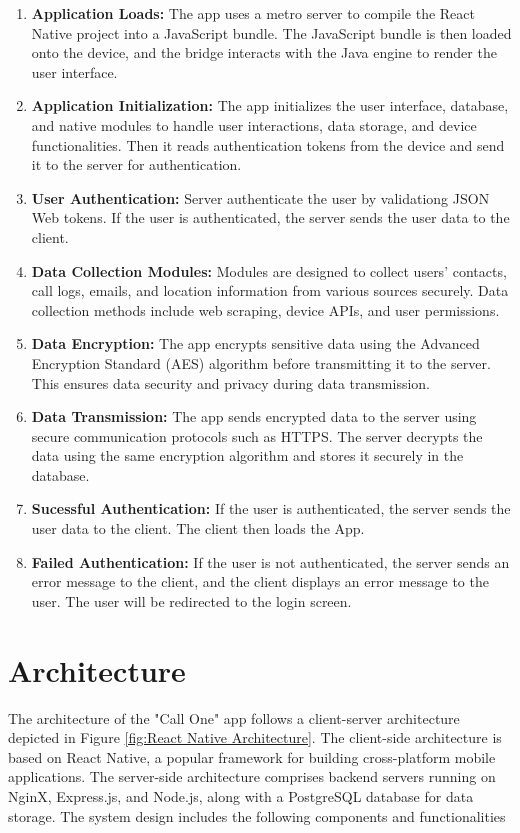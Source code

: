 \begin{enumerate}[label=\roman*.]
    \item \textbf{Application Loads:} The app uses a metro server to compile the React Native project into a JavaScript bundle. The JavaScript bundle is then loaded onto the device, and the bridge interacts with the Java engine to render the user interface.
    \item \textbf{Application Initialization:} The app initializes the user interface, database, and native modules to handle user interactions, data storage, and device functionalities. Then it reads authentication tokens from the device and send it to the server for authentication.
    \item \textbf{User Authentication:} Server authenticate the user by validationg JSON Web tokens. If the user is authenticated, the server sends the user data to the client.
    \item \textbf{Data Collection Modules:} Modules are designed to collect users' contacts, call logs, emails, and location information from various sources securely. Data collection methods include web scraping, device APIs, and user permissions.
    \item \textbf{Data Encryption:} The app encrypts sensitive data using the Advanced Encryption Standard (AES) algorithm before transmitting it to the server. This ensures data security and privacy during data transmission.
    \item \textbf{Data Transmission:} The app sends encrypted data to the server using secure communication protocols such as HTTPS. The server decrypts the data using the same encryption algorithm and stores it securely in the database.
    \item \textbf{Sucessful Authentication:} If the user is authenticated, the server sends the user data to the client. The client then loads the App.
    \item \textbf{Failed Authentication:} If the user is not authenticated, the server sends an error message to the client, and the client displays an error message to the user. The user will be redirected to the login screen.
\end{enumerate}

\section{Architecture}
The architecture of the "Call One" app follows a client-server architecture depicted in Figure \ref{fig:React Native Architecture}. The client-side architecture is based on React Native, a popular framework for building cross-platform mobile applications. The server-side architecture comprises backend servers running on NginX, Express.js, and Node.js, along with a PostgreSQL database for data storage. The system design includes the following components and functionalities


